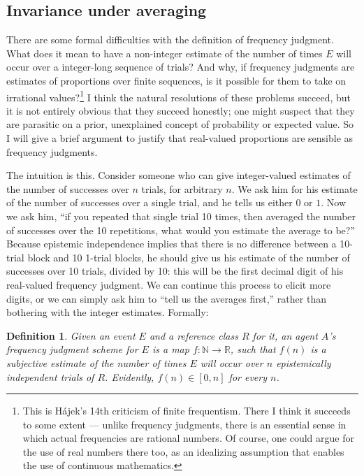 \documentclass[letterpaper,12pt]{article}
\newcommand{\hajek}{H\'ajek}
\newtheorem{definition}{Definition}
\begin{document}
\subsection{Invariance under averaging}
There are some formal difficulties with the definition of frequency judgment. What does it mean to have a non-integer estimate of the number of times $E$ will occur over a integer-long sequence of trials? And why, if frequency judgments are estimates of proportions over finite sequences, is it possible for them to take on irrational values?\footnote{This is \hajek's 14th criticism of finite frequentism. There I think it succeeds to some extent --- unlike frequency judgments, there is an essential sense in which actual frequencies are rational numbers. Of course, one could argue for the use of real numbers there too, as an idealizing assumption that enables the use of continuous mathematics.} I think the natural resolutions of these problems succeed, but it is not entirely obvious that they succeed honestly; one might suspect that they are parasitic on a prior, unexplained concept of probability or expected value. So I will give a brief argument to justify that real-valued proportions are sensible as frequency judgments.

The intuition is this. Consider someone who can give integer-valued estimates of the number of successes over $n$ trials, for arbitrary $n$. We ask him for his estimate of the number of successes over a single trial, and he tells us either $0$ or $1$. Now we ask him, ``if you repeated that single trial 10 times, then averaged the number of successes over the 10 repetitions, what would you estimate the average to be?'' Because epistemic independence implies that there is no difference between a 10-trial block and 10 1-trial blocks, he should give us his estimate of the number of successes over 10 trials, divided by 10: this will be the first decimal digit of his real-valued frequency judgment. We can continue this process to elicit more digits, or we can simply ask him to ``tell us the averages first,'' rather than bothering with the integer estimates. Formally:

\begin{definition}
Given an event $E$ and a reference class $R$ for it, an agent $A$'s frequency judgment scheme for $E$ is a map $f: \mathbb{N} \to \mathbb{R}$, such that $f(n)$ is a subjective estimate of the number of times $E$ will occur over $n$ epistemically independent trials of $R$. Evidently, $f(n) \in [0, n]$ for every $n$.
\end{definition}
\end{document}
